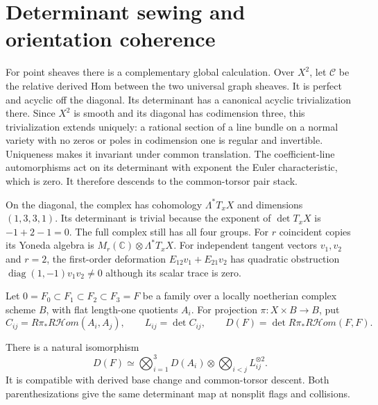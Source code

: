 \section{Determinant sewing and orientation coherence}
\label{cycompact:sec:orientations}

For point sheaves there is a complementary global calculation.
Over $X^2$, let $\mathcal C$ be the relative derived Hom
between the two universal graph sheaves. It is perfect and
acyclic off the diagonal. Its determinant has a canonical
acyclic trivialization there. Since $X^2$ is smooth and its
diagonal has codimension three, this trivialization extends
uniquely: a rational section of a line bundle on a normal
variety with no zeros or poles in codimension one is regular
and invertible. Uniqueness makes it invariant under common
translation. The coefficient-line automorphisms act on its
determinant with exponent the Euler characteristic, which is
zero. It therefore descends to the common-torsor pair stack.

On the diagonal, the complex has cohomology
$\Lambda^*T_xX$ and dimensions $(1,3,3,1)$.
Its determinant is trivial because the exponent of
$\det T_xX$ is $-1+2-1=0$. The full complex still has
all four groups. For $r$ coincident copies its Yoneda algebra
is $M_r(\mathbb C)\otimes\Lambda^*T_xX$.
For independent tangent vectors $v_1,v_2$ and $r=2$,
the first-order deformation $E_{12}v_1+E_{21}v_2$ has
quadratic obstruction
$\operatorname{diag}(1,-1)v_1v_2\ne0$ although its scalar
trace is zero.

Let $0=F_0\subset F_1\subset F_2\subset F_3=F$ be a
family over a locally noetherian complex scheme $B$, with
flat length-one quotients $A_i$.
For projection $\pi:X\times B\to B$, put
\[
 C_{ij}=R\pi_*R\mathcal Hom(A_i,A_j),\qquad
 L_{ij}=\det C_{ij},\qquad
 D(F)=\det R\pi_*R\mathcal Hom(F,F).
\]

\begin{proposition}\label{cycompact:prop:flag-determinant}
There is a natural isomorphism
\begin{equation}\label{cycompact:eq:flag-determinant}
 D(F)\simeq\bigotimes_{i=1}^3D(A_i)
                \otimes\bigotimes_{i<j}L_{ij}^{\otimes2}.
\end{equation}
It is compatible with derived base change and common-torsor
descent. Both parenthesizations give the same determinant
map at nonsplit flags and collisions.
\end{proposition}

